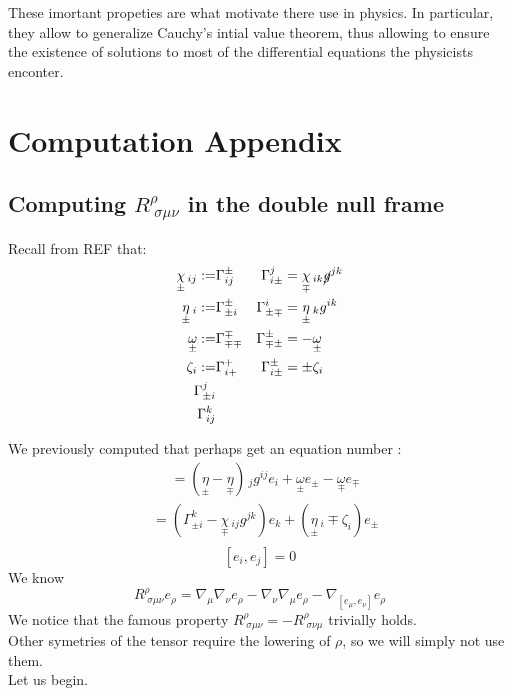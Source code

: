 \documentclass[a4paper,11pt]{article}
\numberwithin{equation}{section}
\theoremstyle{definition}
\begin{document}
These imortant propeties are what motivate there use in physics. In particular, they allow to generalize Cauchy's intial value theorem, thus allowing to ensure the existence of solutions to most of the differential equations the physicists enconter.

\newpage
\section{Computation Appendix}
\subsection{Computing $R^\rho_{\;\sigma\mu\nu}$ in the double null frame} \label{CompR}
Recall from \color{red} REF \color{black} that:
\begin{align*}
    \underset{\pm}{\chi}\,_{ij} :=&\Gamma_{ij}^\pm &\Gamma_{i\pm}^j&=\underset{\mp}{\chi}\,_{ik}\cancel{g}^{jk}\\
    \underset{\pm}{\eta}\,_i :=&\Gamma_{\pm i}^\pm &\Gamma_{\pm\mp}^i&=\underset{\pm}{\eta}\,_kg^{ik}\\
    \underset{\pm}{\omega}:=&\Gamma_{\mp\mp}^\mp &\Gamma_{\mp\pm}^\pm&=-\underset{\pm}{\omega}\\
    \zeta_i :=& \Gamma_{i+}^+ &\Gamma_{i\pm}^\pm&=\pm\zeta_i \\
    \Gamma_{\pm i}^j&\\
    \Gamma_{ij}^k&
\end{align*}

We previously computed that \color{red} perhaps get an equation number \color{black}:
\begin{align*}
    [e_\pm,e_\mp]
    &=(\underset{\pm}{\eta}-\underset{\mp}{\eta})\,_jg^{ij} e_i+ \underset{\pm}{\omega} e_\pm - \underset{\mp}{\omega} e_\mp
\end{align*}
\begin{align*}
    [e_\pm,e_i]&=(\Gamma_{\pm i}^k - \underset{\mp}{\chi}\,_{ij}g^{jk}) e_k + (\underset{\pm}{\eta}\,_i \mp \zeta_i) e_\pm\\
\end{align*}
$$[e_i,e_j]=0$$
We know 
\begin{equation}
    R^\rho_{\;\sigma\mu\nu} e_\rho = \nabla_\mu\nabla_\nu e_\rho-\nabla_\nu\nabla_\mu e_\rho-\nabla_{[e_\mu,e_\nu]}e_\rho
\end{equation}
We notice that the famous property $R^\rho_{\;\sigma\mu\nu}=-R^\rho_{\;\sigma\nu\mu}$ trivially holds.\\
Other symetries of the tensor require the lowering of $\rho$, so we will simply not use them.\\
Let us begin.
\end{document}
